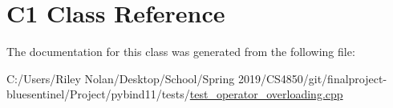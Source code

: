 \hypertarget{class_c1}{}\section{C1 Class Reference}
\label{class_c1}


The documentation for this class was generated from the following file\+:\begin{DoxyCompactItemize}
\item 
C\+:/\+Users/\+Riley Nolan/\+Desktop/\+School/\+Spring 2019/\+C\+S4850/git/finalproject-\/bluesentinel/\+Project/pybind11/tests/\mbox{\hyperlink{test__operator__overloading_8cpp}{test\+\_\+operator\+\_\+overloading.\+cpp}}\end{DoxyCompactItemize}
